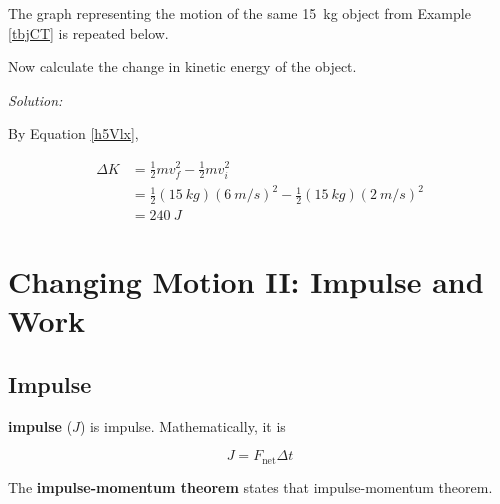 \documentclass[dvipsnames]{article}
\newif\ifShowUnitIV
\begin{document}
\begin{example}
The graph representing the motion of the same \SI{15}{kg} object from Example \ref{tbjCT} is repeated below.

\begin{center}
\end{center}


Now calculate the change in kinetic energy of the object.
\end{example}

\textit{Solution:}

By Equation \eqref{h5Vlx},

\begin{align*}
    \Delta K &= \frac{1}{2} m v_f^2 - \frac{1}{2} m v_i^2 \\[1ex]
    &= \frac{1}{2}(\SI{15}{kg})\left(\SI{6}{m/s}\right)^2 - \frac{1}{2}(\SI{15}{kg})\left(\SI{2}{m/s}\right)^2 \\[1ex]
    &= \boxed{\SI{240}{J}}
\end{align*}

\clearpage

\fi

\section{Changing Motion II: Impulse and Work}

\ifShowUnitIV
\setcounter{example}{0}

\subsection{Impulse}
\textbf{\Gls{impulse}} ($J$) is \glsdesc{impulse}. Mathematically, it is 

\begin{equation*}
    J = F_\text{net} \Delta t
\end{equation*}

The \textbf{\gls{impulse-momentum theorem}} states that \glsdesc{impulse-momentum theorem}.
\end{document}
